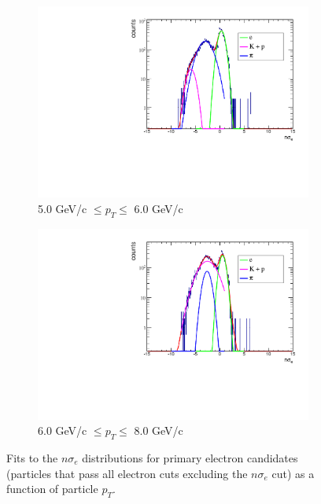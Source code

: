 \begin{figure}[htbp]
\begin{subfigure}{0.5\textwidth}
        \includegraphics[width=\textwidth]{Plots/NPE/nsigmae/nsig_5_6.pdf}
        \caption{5.0 GeV/c $\leq p_{T} \leq$ 6.0 GeV/c}
        \label{fig:nsigma_5_6}
    \end{subfigure}
    \begin{subfigure}{0.5\textwidth}
        \includegraphics[width=\textwidth]{Plots/NPE/nsigmae/nsig_6_8.pdf}
        \caption{6.0 GeV/c $\leq p_{T} \leq$ 8.0 GeV/c}
        \label{fig:nsigma_6_8}
    \end{subfigure}
\caption[Fits of $n\sigma_e$]{Fits to the $n\sigma_e$ distributions for primary electron candidates (particles that pass all electron cuts excluding the $n\sigma_e$ cut) as a function of particle $p_T$. }
\label{fig:nsigma_fits}
\end{figure}

